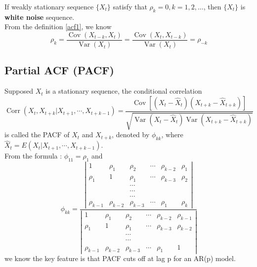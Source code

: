 \documentclass{article}
\begin{document}
\noindent If weakly stationary sequence $\{X_t\}$ satisfy that $\rho_k = 0, k = 1, 2, \dots$, then $\{X_t\}$ is \textbf{white noise} sequence.\\

\noindent From the definition \eqref{acf1}, we know
\begin{equation*}
\rho_k = \frac{\operatorname{Cov}\left(X_{t-k}, X_{t}\right)}{\operatorname{Var}\left(X_{t}\right)} = \frac{\operatorname{Cov}\left(X_{t}, X_{t-k}\right)}{\operatorname{Var}\left(X_{t}\right)} = \rho_{-k}
\end{equation*}

\subsection{Partial ACF (PACF)}
Supposed $X_t$ is a stationary sequence, the conditional correlation
\begin{equation*}
\operatorname{Corr}\left(X_{t}, X_{t+k} | X_{t+1}, \cdots, X_{t+k-1}\right) = \frac{\operatorname{Cov}\left[\left(X_{t}-\hat{X}_{t}\right)\left(X_{t+k}-\hat{X}_{t+k}\right)\right]}{\sqrt{\operatorname{Var}\left(X_{t}-\hat{X}_{t}\right) \operatorname{Var}\left(X_{t+k}-\hat{X}_{t+k}\right)}}
\end{equation*}
is called the PACF of $X_t$ and $X_{t+k}$, denoted by $\phi_{kk}$, where $\hat{X}_{t}=E\left(X_{t} | X_{t+1}, \cdots, X_{t+k-1}\right).$\\

\noindent From the formula : $\phi_{11} = \rho_1$ and
\begin{equation*}
\phi_{kk} = \frac{
\left| \begin{array}{cccccc}{1} & {\rho_{1}} & {\rho_{2}} & {\cdots} & {\rho_{k-2}} & {\rho_{1}} \\ {\rho_{1}} & {1} & {\rho_{1}} & {\cdots} & {\rho_{k-3}} & {\rho_{2}} \\ { } & { } & {\cdots} & { } & { } \\ { } & { } & {\cdots} \\ { } & { } & {\cdots} \\ {\rho_{k-1}} & {\rho_{k-2}} & {\rho_{k-3}} & {\cdots} & {\rho_{1}} & {\rho_{k}}\end{array}\right|}{
\left| \begin{array}{cccccc}{1} & {\rho_{1}} & {\rho_{2}} & {\cdots} & {\rho_{k-2}} & {\rho_{k-1}} \\ {\rho_{1}} & {1} & {\rho_{1}} & {\cdots} & {\rho_{k-3}} & {\rho_{k-2}} \\ { } & { } & {\cdots} & { } & { } \\ { } & { } & {\cdots} \\ {\rho_{k-1}} & {\rho_{k-2}} & {\rho_{k-3}} & {\cdots} & {\rho_{1}} & {1}\end{array}\right|
}
\end{equation*}
we know the key feature is that PACF cuts off at lag p for an AR(p) model.
\end{document}

